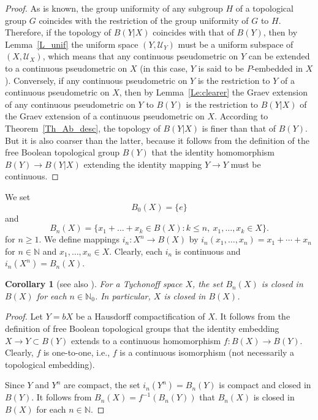 \documentclass[a4paper,12pt]{amsart}
\def\sub{\subset}
\newtheorem{corollary}[theorem]{Corollary}
\theoremstyle{definition}
\begin{document}
\begin{proof}
As is known, the group uniformity of any subgroup $H$ of a topological 
group $G$ coincides with the restriction of the group uniformity of $G$ 
to $H$. Therefore,  if the topology of $B(Y|X)$ coincides with that of $B(Y)$, 
then by Lemma~\ref{L_unif} the uniform space $(Y, \mathscr U_Y)$ must be a 
uniform subspace of $(X, \mathscr U_X)$, which means that any continuous 
pseudometric on $Y$ can be extended to a continuous pseudometric on $X$ (in 
this case, $Y$ is said to be $P$-embedded in $X$ \cite{Shapiro}). Conversely, 
if any continuous pseudometric on $Y$ is the restriction to $Y$ of a continuous 
pseudometric on $X$, then by Lemma~\ref{Le:clearer} the Graev extension of 
any continuous pseudometric on $Y$ to $B(Y)$ is the restriction to $B(Y|X)$ of 
the Graev extension of a continuous pseudometric on $X$. According to 
Theorem~\ref{Th_Ab_desc}, the topology of $B(Y|X)$ is finer than that of 
$B(Y)$. But it is also coarser than the latter, because it follows from the 
definition of the free Boolean topological group $B(Y)$ that the identity 
homomorphism $B(Y)\to B(Y|X)$ extending the identity mapping $Y\to Y$ must be 
continuous. 
\end{proof}

We set\label{B_n(X)}  
$$
B_0(X)=\{e\} 
$$
and 
$$
B_n(X)= \{x_1+\dots+x_k\in B(X): k\le n,\ x_1,\dots, x_k\in X\}.
$$ 
for $n\ge 1$.
We define mappings $i_n\colon X^n\to B(X)$ 
by $i_n(x_1,\ldots,x_n)=x_1+\cdots+x_n$ for $n\in \mathbb N$ and $x_1,\ldots,x_n
\in X$. Clearly, each $i_n$ is continuous and $i_n(X^n)=B_n(X)$. 

\begin{corollary}[{see also \cite[p.~501]{Sip}}]
\label{Th_clo}
For a Tychonoff space $X$, the set $B_n(X)$ 
is closed in $B(X)$ for each $n\in \mathbb N_0$. In particular, 
$X$ is closed in $B(X)$. 
\end{corollary}
 
\begin{proof}
Let $Y=bX$ be a Hausdorff compactification of $X$.
It follows from the definition of free Boolean topological groups
that the identity embedding $X\to Y\sub B(Y)$ extends to a
continuous homomorphism $f\colon B(X)\to B(Y)$. Clearly,
$f$ is one-to-one, i.e., $f$ is a continuous isomorphism (not
necessarily a topological embedding). 

Since $Y$ and $Y^n$ are compact, the set $i_n(Y^n)=B_n(Y)$ 
is compact and closed in $B(Y)$. It follows from 
$B_n(X) = f^{-1}(B_n(Y))$ that $B_n(X)$ is closed in $B(X)$ 
for each $n\in \mathbb N$.
 \end{proof} 
 
\end{document}
